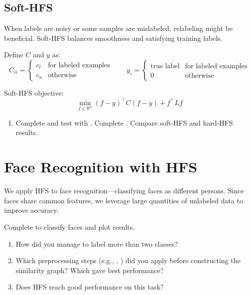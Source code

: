 \documentclass[11pt]{article}
\begin{document}
\subsection{Soft-HFS}

When labels are noisy or some samples are mislabeled, relabeling might be
beneficial. Soft-HFS balances smoothness and satisfying training labels.

Define $C$ and $y$ as:
\begin{equation}
C_{ii} =
\begin{cases}
c_l & \text{for labeled examples}  \\
c_u & \text{otherwise}
\end{cases}
\quad\quad
y_i =
\begin{cases}
\text{true label} & \text{for  labeled examples}  \\
0 & \text{otherwise}
\end{cases}
\end{equation}

Soft-HFS objective:
\begin{equation}
	\min_{f \in \mathbb{R}^n}  (f - y)^\top C (f - y) + f^\top L f
\end{equation}

\begin{questionbox}
\begin{enumerate}[leftmargin=*,resume]
	\item Complete  and test with .
		Complete . Compare soft-HFS and hard-HFS results.
\end{enumerate}
\end{questionbox}

\section{Face Recognition with HFS}

We apply HFS to face recognition---classifying faces as different persons.
Since faces share common features, we leverage large quantities
of unlabeled data to improve accuracy.

Complete  to classify faces and plot results.

\begin{questionbox}
\begin{enumerate}[leftmargin=*]
	\item How did you manage to label more than two classes?
	\item Which preprocessing steps (e.g., , )
	did you apply before constructing the similarity graph? Which gave best performance?
	\item Does HFS reach good performance on this task?
\end{enumerate}
\end{questionbox}
\end{document}
